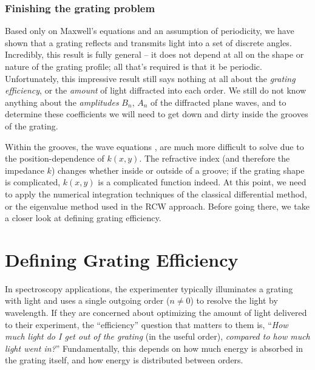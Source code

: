 \subsubsection{Finishing the grating problem}
Based only on Maxwell's equations and an assumption of periodicity, we have shown that a grating reflects and transmits light into a set of discrete angles.  Incredibly, this result is fully general -- it does not depend at all on the shape or nature of the grating profile; all that's required is that it be periodic.  Unfortunately, this impressive result still says nothing at all about the \emph{grating efficiency}, or the \emph{amount} of light diffracted into each order.  We still do not know anything about the \emph{amplitudes} $B_n$, $A_n$ of the diffracted plane waves, and to determine these coefficients we will need to get down and dirty inside the grooves of the grating.

Within the grooves, the wave equations ,  are much more difficult to solve due to the position-dependence of $k(x,y)$.  The refractive index (and therefore the impedance $k$) changes whether inside or outside of a groove; if the grating shape is complicated, $k(x,y)$ is a complicated function indeed.
At this point, we need to apply the numerical integration techniques of the classical differential method, or the eigenvalue method used in the RCW approach.  Before going there, we take a closer look at defining grating efficiency.


\section{Defining Grating Efficiency}
In spectroscopy applications, the experimenter typically illuminates a grating with light and uses a single outgoing order ($n\neq0$) to resolve the light by wavelength.  If they are concerned about optimizing the amount of light delivered to their experiment, the ``efficiency'' question that matters to them is, ``\emph{How much light do I get out of the grating} (in the useful order), \emph{compared to how much light went in?}''  Fundamentally, this depends on how much energy is absorbed in the grating itself, and how energy is distributed between orders.

